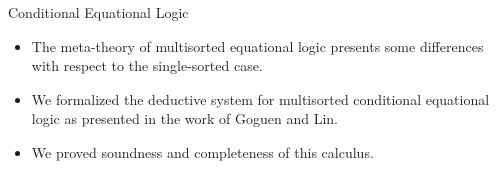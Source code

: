 \documentclass[11pt]{beamer}
\begin{document}
\begin{frame}[fragile]{Conditional Equational Logic}

\begin{itemize}[<+->]
\item The meta-theory of multisorted equational logic presents some
  differences with respect to the single-sorted case.

\item We formalized the deductive system for multisorted conditional
  equational logic as presented in the work of Goguen and Lin.

\item We proved soundness and completeness of this calculus.

\end{itemize}
  
\end{frame}
\end{document}
